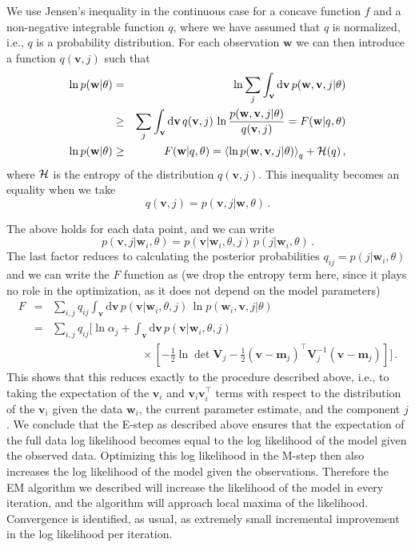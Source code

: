 \documentclass[aoas,preprint,authoryear,round]{imsart}
\newcommand{\ie}{i.e.}
\renewcommand{\vec}[1]{\mathbf{#1}} %
\newcommand{\mm}{\vec{m}}
\newcommand{\vv}{\vec{v}}
\newcommand{\ww}{\vec{w}}
\newcommand{\mmj}{\mm_j}
\newcommand{\vvi}{\vv_i}
\newcommand{\wwi}{\ww_i}
\newcommand{\ten}[1]{\mathbf{#1}} %
\newcommand{\VV}{\ten{V}}
\newcommand{\VVj}{\VV_{\!j}} %
\newcommand{\T}{^{\scriptscriptstyle \top}}   %
\newcommand{\qij}{q_{ij}}
\begin{document}
We use Jensen's inequality in the continuous case for a
concave function $f$ and a non-negative integrable function $q$, where
we have assumed that $q$ is normalized, \ie, $q$ is a probability
distribution. For each observation $\ww$ we can then introduce a
function $q(\vv,j)$ such that
\begin{eqnarray}\displaystyle
\ln p(\ww|\theta) &=& \ln \sum_j \int_{\vv} \mathrm{d}\vv \,
    p(\ww,\vv,j|\theta)\nonumber \\
    &\geq& \sum_j
    \int_{\vv}\mathrm{d}\vv \, q(\vv,j)\,\ln \frac{p(\ww,\vv,j|\theta)}{q(\vv,j)} =
    F(\ww|q,\theta)\nonumber \\
    \ln
    p(\ww|\theta) &\geq& F(\ww|q,\theta) = \left\langle \ln
    p(\ww,\vv,j|\theta) \right\rangle_{q} + {\cal H}(q) \, ,
\end{eqnarray}
where ${\cal H}$ is the entropy of the distribution $q(\vv,j)$. This
inequality becomes an equality when we take
\begin{equation}
q(\vv,j) =  p(\vv,j|\ww,\theta) \, .
\end{equation}

The above holds for each data point, and we can write
\begin{equation}
p(\vv,j|\wwi,\theta) = p(\vv|\wwi,\theta,j) \, p(j|\wwi,\theta) \, .
\end{equation}
The last factor reduces to calculating the posterior probabilities
$\qij=p(j|\wwi,\theta)$ and we can write the $F$ function as (we drop
the entropy term here, since it plays no role in the optimization, as
it does not depend on the model parameters)
\begin{eqnarray*}\displaystyle
F &=& \sum_{i,j} \qij  \int_{\vv}\mathrm{d}\vv \, p(\vv|\wwi,\theta,j) \,\ln p(\wwi,\vv,j|\theta)\\
&=& \sum_{i,j} \qij  \Bigg[ \ln \alpha_j + \int_{\vv}\mathrm{d}\vv \, p(\vv|\wwi,\theta,j) \\
&& \qquad \qquad \qquad \qquad \times \left[ -\frac{1}{2}  \ln \det \VV_j -\frac{1}{2} (\vv-\mmj)\T\VVj^{-1}(\vv-\mmj)\right]\Bigg]\, .\nonumber
\end{eqnarray*}
This shows that this reduces exactly to
the procedure described above, \ie, to taking the expectation of the
$\vvi$ and $\vvi\vvi\T$ terms with respect to the distribution of the
$\vvi$ given the data $\wwi$, the current parameter estimate, and the
component $j$. We conclude that the E-step as described above ensures
that the expectation of the full data log likelihood becomes equal to
the log likelihood of the model given the observed data. Optimizing
this log likelihood in the M-step then also increases the log
likelihood of the model given the observations. Therefore the EM
algorithm we described will increase the likelihood of the model in
every iteration, and the algorithm will approach local maxima of the
likelihood. Convergence is identified, as usual, as extremely small
incremental improvement in the log likelihood per iteration.
\end{document}
